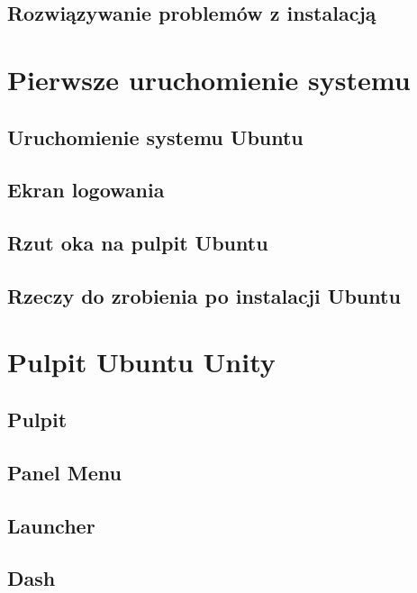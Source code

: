 \documentclass[a4paper,11pt,oneside]{mwart}
\begin{document}
        \subsection{Rozwiązywanie problemów z instalacją}
                                 
\section{Pierwsze uruchomienie systemu}
        \subsection{Uruchomienie systemu Ubuntu}
                
        \subsection{Ekran logowania}
                
        \subsection{Rzut oka na pulpit Ubuntu}
                
        \subsection{Rzeczy do zrobienia po instalacji Ubuntu}
                
\section{Pulpit Ubuntu Unity}
        \label{pulpit_unity}
        \subsection{Pulpit}
        		       
        \subsection{Panel Menu}
        		
        \subsection{Launcher}
        		
        \subsection{Dash}
        		
\end{document}
